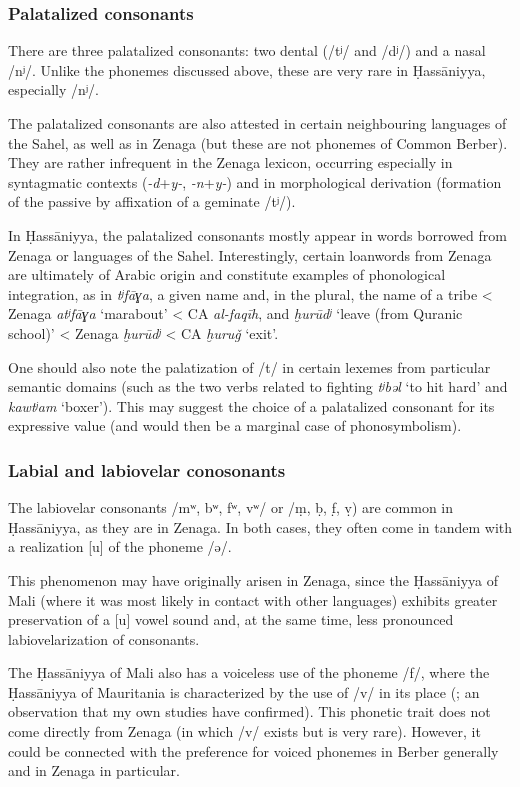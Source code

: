 \documentclass[output=paper]{langsci/langscibook}
\begin{document}
\subsubsection{ Palatalized consonants} %
There are three palatalized consonants: two dental (/tʲ/ and /dʲ/) and a nasal /nʲ/. Unlike the phonemes discussed above, these are very rare in Ḥassāniyya, especially /nʲ/.

The palatalized consonants are also attested in certain neighbouring languages of the Sahel, as well as in Zenaga (but these are not phonemes of Common Berber). They are rather infrequent in the Zenaga lexicon, occurring especially in syntagmatic contexts (\textit{{}-d}+\textit{y-}, \textit{{}-n}+\textit{y-}) and in morphological derivation (formation of the passive by affixation of a geminate /tʲ/).

In Ḥassāniyya, the palatalized consonants mostly appear in words borrowed from Zenaga or languages of the Sahel. Interestingly, certain loanwords from Zenaga are ultimately of Arabic origin and constitute examples of phonological integration, as in \textit{tʲfāɣa}, a given name and, in the plural, the name of a tribe < Zenaga \textit{atʲfāɣa} ‘marabout’ < CA \textit{al-faqīh}, and \textit{ḫurūdʲ} ‘leave (from Quranic school)’ < Zenaga \textit{ḫurūdʲ} < CA \textit{ḫuruǧ} ‘exit’.

One should also note the palatization of /t/ in certain lexemes from particular semantic domains (such as the two verbs related to fighting \textit{tʲbəl} ‘to hit hard’ and \textit{kawtʲam} ‘boxer’). This may suggest the choice of a palatalized consonant for its expressive value (and would then be a marginal case of phonosymbolism).

\subsubsection{ Labial and labiovelar conosonants} %
The labiovelar consonants /mʷ, bʷ, fʷ, vʷ/ or /ṃ, ḅ, f̣, ṿ) are common in Ḥassāniyya, as they are in Zenaga. In both cases, they often come in tandem with a realization [u] of the phoneme /ə/. 

This phenomenon may have originally arisen in Zenaga, since the Ḥassāniyya of Mali (where it was most likely in contact with other languages) exhibits greater preservation of a [u] vowel sound and, at the same time, less pronounced labiovelarization of consonants. 

The Ḥassāniyya of Mali also has a voiceless use of the phoneme /f/, where the Ḥassāniyya of Mauritania is characterized by the use of /v/ in its place (\citealt{Heath2004}; an observation that my own studies have confirmed). This phonetic trait does not come directly from Zenaga (in which /v/ exists but is very rare). However, it could be connected with the preference for voiced phonemes in Berber generally and in Zenaga in particular.
\end{document}
